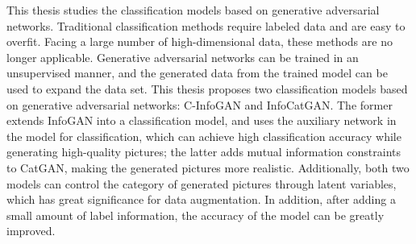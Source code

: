 This thesis studies the classification models based on generative adversarial networks. Traditional classification methods require labeled data and are easy to overfit. Facing a large number of high-dimensional data, these methods are no longer applicable. Generative adversarial networks can be trained in an unsupervised manner, and the generated data from the trained model can be used to expand the data set. This thesis proposes two classification models based on generative adversarial networks: C-InfoGAN and InfoCatGAN. The former extends InfoGAN into a classification model, and uses the auxiliary network in the model for classification, which can achieve high classification accuracy while generating high-quality pictures; the latter adds mutual information constraints to CatGAN, making the generated pictures more realistic. Additionally, both two models can control the category of generated pictures through latent variables, which has great significance for data augmentation. In addition, after adding a small amount of label information, the accuracy of the model can be greatly improved.

